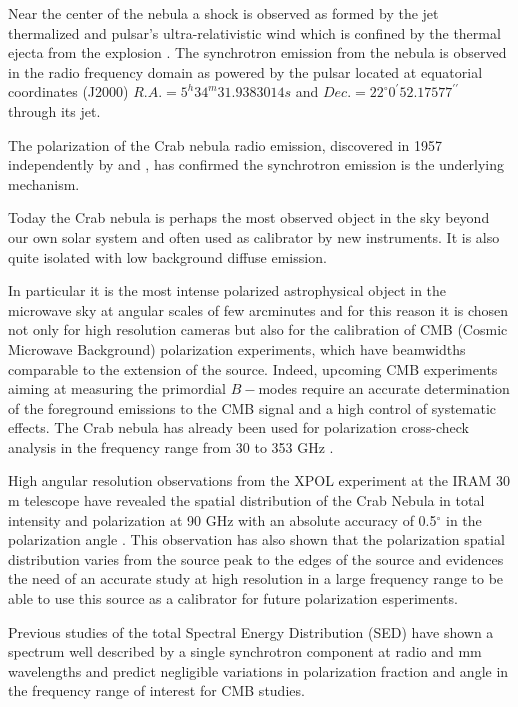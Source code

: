 \documentclass[twocolumn,traditabstract]{aa}
\begin{document}
Near the center of the nebula a shock is observed as formed by the jet thermalized and pulsar's ultra-relativistic wind which is confined by the thermal ejecta from the explosion \citep{2000ApJ...536L..81W,2011A&A...528A..11W}.  
The synchrotron emission from the nebula is observed in the radio frequency domain as powered by the pulsar located at equatorial coordinates (J2000) $R.A. = 5^h34^m31.9383014s$ and $Dec. = 22^{\circ}0^{\prime}52.17577^{\prime\prime}$ \citep{Lobanov} through its jet.

The polarization of the Crab nebula radio emission, discovered in 1957 independently by \citet{1957ApJ...126..468M} and \citet{1959SvA.....3...39K}, has confirmed the synchrotron emission is the underlying mechanism. 

Today the Crab nebula is perhaps the most observed object in the sky beyond our own solar system \citep{2008ARA&A..46..127H} and often used as calibrator by new instruments. It is also quite isolated
with low background diffuse emission. 

In particular it is the most intense polarized astrophysical object in the microwave sky
at angular scales of few arcminutes and for this reason it is chosen not only for high resolution cameras
but also for the calibration of
CMB (Cosmic Microwave Background) polarization experiments, which have
beamwidths comparable to the extension of the source. 
Indeed, upcoming CMB experiments aiming at measuring the primordial $B-$modes require an accurate
determination of the foreground emissions to the CMB signal and a high control
of systematic effects.
The Crab nebula has already been used for polarization cross-check analysis in the frequency
range from 30 to 353 GHz \citep{2011ApJS..192...19W,2015arXiv150702058P}.

High angular resolution observations from the XPOL experiment \citep{thum2008} at the
IRAM 30 m telescope have revealed the spatial distribution of the Crab Nebula in
total intensity and polarization at 90 GHz with an absolute accuracy of 0.5$^{\circ}$
in the polarization angle \citep{aumont2010}.
This observation has also shown that the polarization spatial distribution varies from the source peak
to the edges of the source and evidences the need of an accurate study at high resolution in a large frequency range to be able to use this source as a calibrator for future polarization esperiments.

Previous studies \citep{macias2010} of the total Spectral Energy Distribution
(SED) have shown a spectrum well described by a single
synchrotron component at radio and mm wavelengths and predict negligible
variations in polarization fraction and angle in the frequency range of interest
for CMB studies.
 
\end{document}
